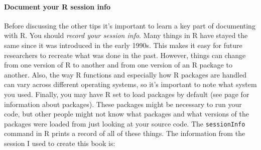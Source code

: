 \documentclass[krantz1]{krantz}
\begin{document}
\paragraph{Document your R session info}\label{SessionInfoHow}

Before discussing the other tips it's important to learn a key part of documenting with R. You should \emph{record your session info}. Many things in R have stayed the same since it was introduced in the early 1990s. This makes it easy for future researchers to recreate what was done in the past. However, things can change from one version of R to another and from one version of an R package to another. Also, the way R functions and especially how R packages are handled can vary across different operating systems, so it's important to note what system you used. Finally, you may have R set to load packages by default (see page \pageref{Packages} for information about packages). These packages might be necessary to run your code, but other people might not know what packages and what versions of the packages were loaded from just looking at your source code. The \texttt{sessionInfo} command in R prints a record of all of these things. The information from the session I used to create this book is:
\end{document}
